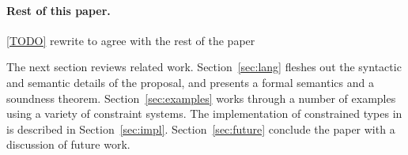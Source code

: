 
%

\paragraph{Rest of this paper.}

\ref{TODO} rewrite to agree with the rest of the paper

The next section reviews related work.
Section~\ref{sec:lang} fleshes out the syntactic and semantic details of the
proposal, and presents a formal semantics
and a soundness theorem.
Section~\ref{sec:examples} works through a number of
examples using a variety of constraint systems.
The implementation of constrained types in \Xten{} is described
in Section~\ref{sec:impl}.
Section~\ref{sec:future}
conclude the paper with a discussion of
future work.


